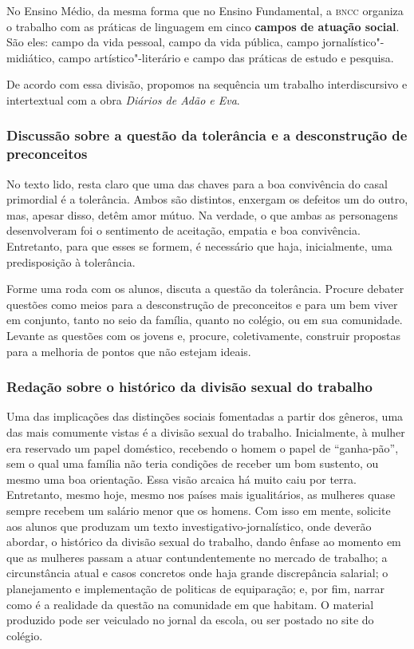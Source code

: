 \documentclass[12pt]{extarticle}
\begin{document}
No Ensino Médio, da mesma forma que no Ensino Fundamental, a \textsc{bncc}
organiza o trabalho com as práticas de linguagem em cinco \textbf{campos
de atuação social}. São eles: campo da vida pessoal, campo da vida
pública, campo jornalístico"-midiático, campo artístico"-literário e campo
das práticas de estudo e pesquisa.

De acordo com essa divisão, propomos na sequência um trabalho
interdiscursivo e intertextual com a obra \emph{Diários de Adão e Eva}.

\subsubsection{Discussão sobre a questão da tolerância e a desconstrução de preconceitos}


No texto lido, resta claro que uma das chaves para a boa convivência
do casal primordial é a tolerância. Ambos são distintos, enxergam os
defeitos um do outro, mas, apesar disso, detêm amor mútuo. Na verdade,
o que ambas as personagens desenvolveram foi o sentimento de
aceitação, empatia e boa convivência. Entretanto, para que esses se
formem, é necessário que haja, inicialmente, uma predisposição à
tolerância.

Forme uma roda com os alunos, discuta a questão da tolerância. Procure
debater questões como meios para a desconstrução de preconceitos e para
um bem viver em conjunto, tanto no seio da família, quanto no colégio,
ou em sua comunidade. Levante as questões com os jovens e, procure,
coletivamente, construir propostas para a melhoria de pontos que não
estejam ideais.

\subsubsection{Redação sobre o histórico da divisão sexual do trabalho}

Uma das implicações das distinções sociais fomentadas a partir dos
gêneros, uma das mais comumente vistas é a divisão sexual do trabalho.
Inicialmente, à mulher era reservado um papel doméstico, recebendo o
homem o papel de ``ganha-pão'', sem o qual uma família não teria
condições de receber um bom sustento, ou mesmo uma boa orientação.
Essa visão arcaica há muito caiu por terra. Entretanto, mesmo hoje,
mesmo nos países mais igualitários, as mulheres quase sempre recebem
um salário menor que os homens. Com isso em mente, solicite aos alunos
que produzam um texto investigativo-jornalístico, onde deverão
abordar, o histórico da divisão sexual do trabalho, dando ênfase ao
momento em que as mulheres passam a atuar contundentemente no mercado
de trabalho; a circunstância atual e casos concretos onde haja grande
discrepância salarial; o planejamento e implementação de politicas de
equiparação; e, por fim, narrar como é a realidade da questão na
comunidade em que habitam. O material produzido pode ser veiculado no
jornal da escola, ou ser postado no site do colégio.
\end{document}
